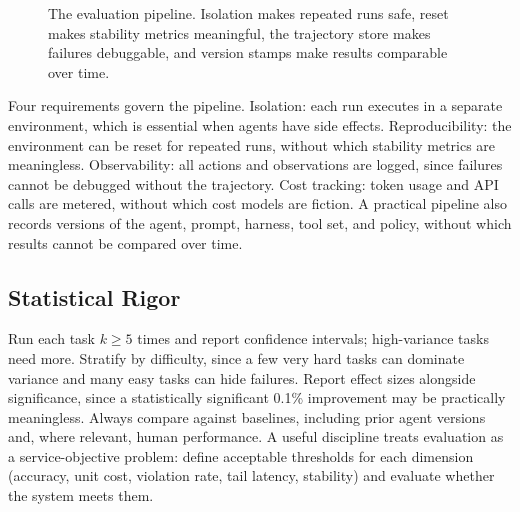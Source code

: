 \documentclass[11pt]{book}
\begin{document}
\begin{figure}[htbp]
\centering
{}
\caption{The evaluation pipeline. Isolation makes repeated runs safe, reset makes stability metrics meaningful, the trajectory store makes failures debuggable, and version stamps make results comparable over time.}
\label{fig:eval-pipeline}
\end{figure}

Four requirements govern the pipeline. Isolation: each run executes in a separate environment, which is essential when agents have side effects. Reproducibility: the environment can be reset for repeated runs, without which stability metrics are meaningless. Observability: all actions and observations are logged, since failures cannot be debugged without the trajectory. Cost tracking: token usage and API calls are metered, without which cost models are fiction. A practical pipeline also records versions of the agent, prompt, harness, tool set, and policy, without which results cannot be compared over time.

\subsection{Statistical Rigor}

Run each task $k \geq 5$ times and report confidence intervals; high-variance tasks need more. Stratify by difficulty, since a few very hard tasks can dominate variance and many easy tasks can hide failures. Report effect sizes alongside significance, since a statistically significant 0.1\% improvement may be practically meaningless. Always compare against baselines, including prior agent versions and, where relevant, human performance. A useful discipline treats evaluation as a service-objective problem: define acceptable thresholds for each dimension (accuracy, unit cost, violation rate, tail latency, stability) and evaluate whether the system meets them.
\end{document}
